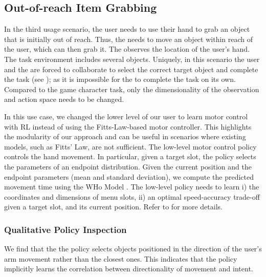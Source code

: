 \subsection{Out-of-reach Item Grabbing}
\label{sec:out-of-reach}

In the third usage scenario, the user needs to use their hand to grab an object that is initially out of reach. Thus, the \interfaceagent needs to move an object within reach of the user, which can then grab it. The \interfaceagent observes the location of the user's hand. The task environment includes several objects. Uniquely, in this scenario the user and the \interfaceagent are forced to collaborate to select the correct target object and complete the task (see ); as it is impossible for the \useragent to complete the task on its own. Compared to the game character task, only the dimensionality of the observation and action space needs to be changed. 

In this use case, we changed the lower level of our user to learn motor control with RL instead of using the Fitts-Law-based motor controller. This highlights the modularity of our approach and can be useful in scenarios where existing models, such as Fitts' Law, are not sufficient.
The low-level motor control policy controls the hand movement. In particular, given a target slot, the policy selects the parameters of an endpoint distribution. Given the current position and the endpoint parameters (mean and standard deviation), we compute the predicted movement time using the WHo Model \cite{guiard2015mathematical}. The low-level policy needs to learn i) the coordinates and dimensions of menu slots, ii) an optimal speed-accuracy trade-off given a target slot, and its current position. Refer to  for more details.

\subsubsection*{Qualitative Policy Inspection}  We find that the the policy selects objects positioned in the direction of the user's arm movement rather than the closest ones. This indicates that the policy implicitly learns the correlation between directionality of movement and intent. 

